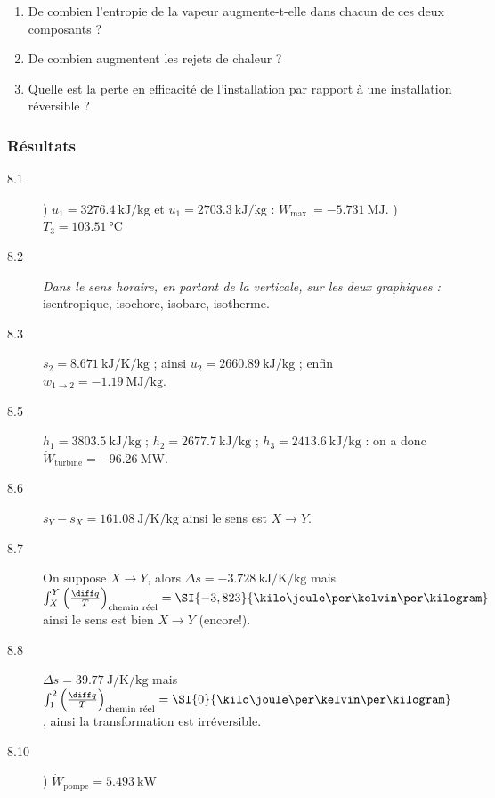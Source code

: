 	\begin{enumerate}
		\item De combien l’entropie de la vapeur augmente-t-elle dans chacun de ces deux composants ?
		\item De combien augmentent les rejets de chaleur ?
		\item Quelle est la perte en efficacité de l’installation par rapport à une installation réversible ?
	\end{enumerate}


\exercisesolutionpage
\subsubsection*{Résultats}
	\linktosolutionsblurb

	\begin{description}
		\item [8.1] ) $u_1 = \SI{3276,4}{\kilo\joule\per\kilogram} $ et $u_1 = \SI{2703,3}{\kilo\joule\per\kilogram}$ : $W_\text{max.} = \SI{-5,731}{\mega\joule}$. 
						) $T_3 = \SI{103,51}{\degreeCelsius}$
		\item [8.2] \tab \textit{Dans le sens horaire, en partant de la verticale, sur les deux graphiques :} isentropique, isochore, isobare, isotherme.
		\item [8.3] \tab $s_2 = \SI{8,671}{\kilo\joule\per\kelvin\per\kilogram}$ ; ainsi $u_2 = \SI{2660,89}{\kilo\joule\per\kilogram}$ ; enfin $w_{1\to 2} = \SI{-1,19}{\mega\joule\per\kilogram}$.
		\item [8.5] \tab $h_1 = \SI{3803,5}{\kilo\joule\per\kilogram}$ ; $h_2 = \SI{2677,7}{\kilo\joule\per\kilogram}$ ; $h_3 = \SI{2413,6}{\kilo\joule\per\kilogram}$ : on a donc $\dot{W}_\text{turbine} = \SI{-96,26}{\mega\watt}$.
		\item [8.6] \tab $s_Y - s_X = \SI{+161,08}{\joule\per\kelvin\per\kilogram}$ ainsi le sens est $X\to Y$.
		\item [8.7] \tab On suppose $X\to Y$, alors $\Delta s = \SI{-3,728}{\kilo\joule\per\kelvin\per\kilogram}$ mais $\int_X^Y \left(\frac{\diff q}{T}\right)_\text{chemin réel} = \SI{-3,823}{\kilo\joule\per\kelvin\per\kilogram}$ ainsi le sens est bien $X\to Y$ (encore!).
		\item [8.8] \tab $\Delta s = \SI{+39,77}{\joule\per\kelvin\per\kilogram}$ mais $\int_1^2 \left(\frac{\diff q}{T}\right)_\text{chemin réel} = \SI{0}{\kilo\joule\per\kelvin\per\kilogram}$, ainsi la transformation est irréversible.
		\item [8.10] 	) $\dot{W}_\text{pompe} = \SI{+5,493}{\kilo\watt}$

\end{description}
